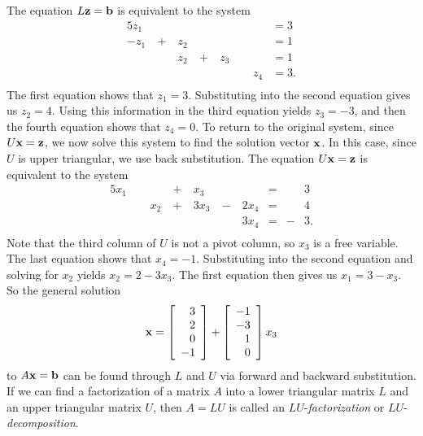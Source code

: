 The equation $L \mathbf{z} = \mathbf{b}$ is equivalent to the system
\begin{alignat*}{5}
{}z_1   \	&{}  \	&{}      \	&{} \	&{}     \	&{} \   &{}       &= 3 \\
{-}z_1  \	&{+} \	&{}z_2   \	&{} \ 	&{}     \	&{}	\   &{}       &= 1 \\
{}      \	&{}  \	&{}z_2   \	&{+} \ 	&{}z_3  \   &{}	\ 	&{}       &= 1 \\
{}      \	&{}  \	&{}      \	&{}  \ 	&{}     \   &{}	\ 	&{}z_4    &= 3. \\
\end{alignat*}
The first equation shows that $z_1=3$. Substituting into the second equation gives us $z_2 = 4$. Using this information in the third equation yields $z_3 = -3$, and then the fourth equation shows that $z_4 = 0$. To return to the original system, since $U\mathbf{x} = \mathbf{z}$, we now solve this system to find the solution vector $\mathbf{x}$. In this case, since $U$ is upper triangular, we use back substitution. The equation $U\mathbf{x} = \mathbf{z}$ is equivalent to the system
\begin{alignat*}{5}
{}x_1   \	&{}  \	&{}      \	&{+} \	&{}x_3   \	&{}    \   &{}       &= &{}&3 \\
{}      \	&{} \	&{}x_2   \	&{+} \ 	&{3}x_3  \	&{-}	\  &{2}x_4   &= &{}&4 \\
{}      \	&{}  \	&{}      \	&{}  \ 	&{}      \   &{}	\  &{3}x_4   &= &{-}&3. \\
\end{alignat*}
Note that the third column of $U$ is not a pivot column, so $x_3$ is a free variable. The last equation shows that $x_4=-1$. Substituting into the second equation and solving for $x_2$ yields $x_2 = 2-3x_3$. The first equation then gives us $x_1 = 3-x_3$. So the general solution 
\[\mathbf{x} = \left[ \begin{array}{r} 3\\2\\0\\-1 \end{array} \right] +  \left[ \begin{array}{r} -1\\-3\\1\\0 \end{array} \right]x_3\]
to $A \mathbf{x} = \mathbf{b}$ can be found through $L$ and $U$ via forward and backward substitution. If we can find a factorization of a matrix $A$ into a lower triangular matrix $L$ and an upper triangular matrix $U$, then $A= LU$ is called an $LU$-\emph{factorization} or $LU$-\emph{decomposition}.  


